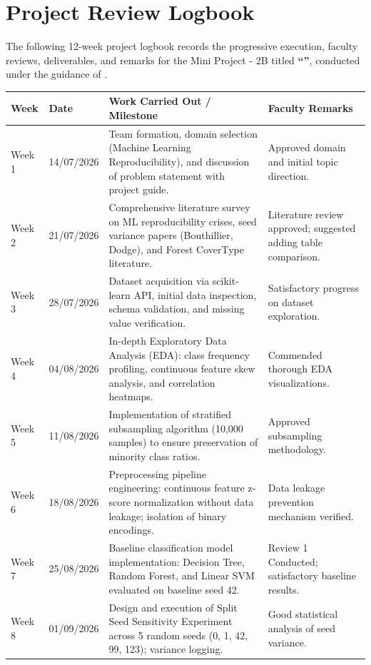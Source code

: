 \chapter{Project Review Logbook}
\label{ch:logbook}

The following 12-week project logbook records the progressive execution, faculty reviews, deliverables, and remarks for the Mini Project - 2B titled \textbf{``\projecttitle''}, conducted under the guidance of \textbf{\guidename}.

\begin{longtable}{p{1.2cm} p{2.2cm} p{6.5cm} p{3.2cm}}
\toprule
\textbf{Week} & \textbf{Date} & \textbf{Work Carried Out / Milestone} & \textbf{Faculty Remarks} \\
\midrule
\endhead
\bottomrule
\endfoot
Week 1 & 14/07/2026 & Team formation, domain selection (Machine Learning Reproducibility), and discussion of problem statement with project guide. & Approved domain and initial topic direction. \\[0.4cm]
Week 2 & 21/07/2026 & Comprehensive literature survey on ML reproducibility crises, seed variance papers (Bouthillier, Dodge), and Forest CoverType literature. & Literature review approved; suggested adding table comparison. \\[0.4cm]
Week 3 & 28/07/2026 & Dataset acquisition via scikit-learn API, initial data inspection, schema validation, and missing value verification. & Satisfactory progress on dataset exploration. \\[0.4cm]
Week 4 & 04/08/2026 & In-depth Exploratory Data Analysis (EDA): class frequency profiling, continuous feature skew analysis, and correlation heatmaps. & Commended thorough EDA visualizations. \\[0.4cm]
Week 5 & 11/08/2026 & Implementation of stratified subsampling algorithm (10,000 samples) to ensure preservation of minority class ratios. & Approved subsampling methodology. \\[0.4cm]
Week 6 & 18/08/2026 & Preprocessing pipeline engineering: continuous feature z-score normalization without data leakage; isolation of binary encodings. & Data leakage prevention mechanism verified. \\[0.4cm]
Week 7 & 25/08/2026 & Baseline classification model implementation: Decision Tree, Random Forest, and Linear SVM evaluated on baseline seed 42. & Review 1 Conducted; satisfactory baseline results. \\[0.4cm]
Week 8 & 01/09/2026 & Design and execution of Split Seed Sensitivity Experiment across 5 random seeds (0, 1, 42, 99, 123); variance logging. & Good statistical analysis of seed variance. \\[0.4cm]

\end{longtable}
